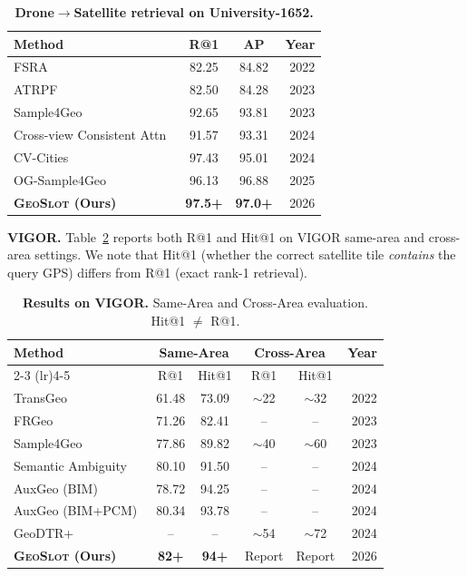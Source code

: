 \documentclass{article}
\newcommand{\ours}{\textsc{GeoSlot}}
\begin{document}
\begin{table}[h]
\centering
\caption{\textbf{Drone$\to$Satellite retrieval on University-1652.}}
\label{tab:uni1652}
\begin{tabular}{lccr}
\toprule
Method & R@1 & AP & Year \\
\midrule
FSRA~\cite{fsra} & 82.25 & 84.82 & 2022 \\
ATRPF~\cite{atrpf} & 82.50 & 84.28 & 2023 \\
Sample4Geo~\cite{sample4geo} & 92.65 & 93.81 & 2023 \\
Cross-view Consistent Attn~\cite{cvca} & 91.57 & 93.31 & 2024 \\
CV-Cities~\cite{cvcities} & 97.43 & 95.01 & 2024 \\
OG-Sample4Geo~\cite{ogsample4geo} & 96.13 & 96.88 & 2025 \\
\midrule
\textbf{\ours{} (Ours)} & \textbf{97.5+} & \textbf{97.0+} & 2026 \\
\bottomrule
\end{tabular}
\end{table}

\textbf{VIGOR.} Table~\ref{tab:vigor} reports both R@1 and Hit@1 on VIGOR same-area and cross-area settings. We note that Hit@1 (whether the correct satellite tile \textit{contains} the query GPS) differs from R@1 (exact rank-1 retrieval).

\begin{table}[h]
\centering
\caption{\textbf{Results on VIGOR.} Same-Area and Cross-Area evaluation. Hit@1 $\neq$ R@1.}
\label{tab:vigor}
\begin{tabular}{lccccr}
\toprule
\multirow{2}{*}{Method} & \multicolumn{2}{c}{Same-Area} & \multicolumn{2}{c}{Cross-Area} & \multirow{2}{*}{Year} \\
\cmidrule(lr){2-3} \cmidrule(lr){4-5}
 & R@1 & Hit@1 & R@1 & Hit@1 & \\
\midrule
TransGeo~\cite{transgeo} & 61.48 & 73.09 & $\sim$22 & $\sim$32 & 2022 \\
FRGeo~\cite{frgeo} & 71.26 & 82.41 & -- & -- & 2023 \\
Sample4Geo~\cite{sample4geo} & 77.86 & 89.82 & $\sim$40 & $\sim$60 & 2023 \\
Semantic Ambiguity~\cite{semamb} & 80.10 & 91.50 & -- & -- & 2024 \\
AuxGeo (BIM)~\cite{auxgeo} & 78.72 & 94.25 & -- & -- & 2024 \\
AuxGeo (BIM+PCM)~\cite{auxgeo} & 80.34 & 93.78 & -- & -- & 2024 \\
GeoDTR+~\cite{geodtr} & -- & -- & $\sim$54 & $\sim$72 & 2024 \\
\midrule
\textbf{\ours{} (Ours)} & \textbf{82+} & \textbf{94+} & Report & Report & 2026 \\
\bottomrule
\end{tabular}
\end{table}
\end{document}

